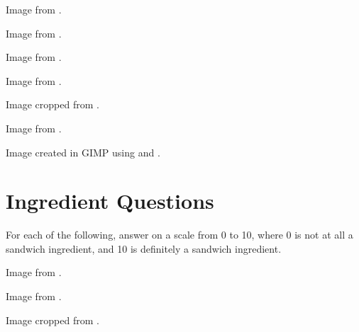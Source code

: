 	\begin{minipage}{\textwidth}
		Image from \cite{oreo}.
	\end{minipage}

	\begin{minipage}{\textwidth}
		Image from \cite{ritzCracker}.
	\end{minipage}

	\begin{minipage}{\textwidth}
		Image from \cite{sushiBurrito}.
	\end{minipage}

	\begin{minipage}{\textwidth}
		Image from \cite{nigiri}.
	\end{minipage}

	\begin{minipage}{\textwidth}
		Image cropped from \cite{cheese}.
	\end{minipage}

	\begin{minipage}{\textwidth}
		Image from \cite{salad}.
	\end{minipage}

	\begin{minipage}{\textwidth}
		Image created in GIMP using \cite{breadSlices} and \cite{brick}.
	\end{minipage}

\clearpage
\section{Ingredient Questions}
	For each of the following, answer on a scale from 0 to 10, where 0 is not at all a sandwich ingredient, and 10 is definitely a sandwich ingredient.

	\begin{minipage}{\textwidth}
		Image from \cite{coldCuts}.
	\end{minipage}

	\begin{minipage}{\textwidth}
		Image from \cite{tomato}.
	\end{minipage}

	\begin{minipage}{\textwidth}
		Image cropped from \cite{cheese}.
	\end{minipage}

